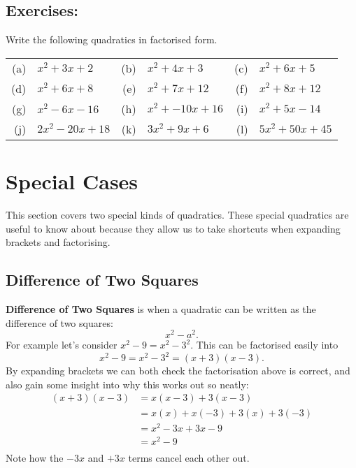 \documentclass[12pt]{article}
\begin{document}
\subsection*{Exercises:}
Write the following quadratics in factorised form. \\
\begin{center}
\begin{tabular}{rlrlrl}
(a) & $x^2 + 3x + 2$ & (b) & $x^2 + 4x + 3$ & (c) & $x^2 + 6x + 5$ \\
(d) & $x^2 + 6x + 8$ & (e) & $x^2 + 7x + 12$ & (f) & $x^2 + 8x + 12$ \\
(g) & $x^2 - 6x - 16$ & (h) & $x^2 + -10x + 16$ & (i) & $x^2 + 5x - 14$ \\
(j) & $2x^2 -20x + 18$ & (k) & $3x^2 + 9x + 6$ & (l) & $5x^2 + 50x + 45$ \\
\end{tabular}
\end{center}

\vspace{0.2cm}\vspace{0.2cm}

\pagebreak
\section*{Special Cases}

This section covers two special kinds of quadratics. These special quadratics are useful to know about because they allow us to take shortcuts when expanding brackets and factorising.

\subsection*{Difference of Two Squares}

\textbf{Difference of Two Squares} is when a quadratic can be written as the difference of two squares: 
\begin{equation*}
x^2 - a^2.
\end{equation*}
For example let's consider $x^2 - 9 = x^2 - 3^2$. This can be factorised easily into  
\begin{equation*}
x^2 - 9 = x^2 - 3^2 = (x+3)(x-3). 
\end{equation*}
By expanding brackets we can both check the factorisation above is correct, and also gain some insight into why this works out so neatly:
\begin{align*}
(x+3)(x-3)  &= x(x-3) + 3(x-3) \\
            &= x(x) + x(-3) + 3(x) + 3(-3) \\
            &= x^2 -3x + 3x - 9 \\
            &= x^2 - 9 \\
\end{align*}
Note how the $-3x$ and $+3x$ terms cancel each other out. 
\end{document}
